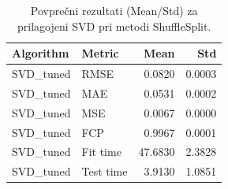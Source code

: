\begin{table}[h]
\centering
\caption{Povprečni rezultati (Mean/Std) za prilagojeni SVD pri metodi ShuffleSplit.}
\label{tab:cv_results_tuned_svd}
\begin{tabular}{llrr}
\toprule
Algorithm & Metric & Mean & Std \\
\midrule
SVD\_tuned & RMSE & 0.0820 & 0.0003 \\
SVD\_tuned & MAE & 0.0531 & 0.0002 \\
SVD\_tuned & MSE & 0.0067 & 0.0000 \\
SVD\_tuned & FCP & 0.9967 & 0.0001 \\
SVD\_tuned & Fit time & 47.6830 & 2.3828 \\
SVD\_tuned & Test time & 3.9130 & 1.0851 \\
\bottomrule
\end{tabular}

\end{table}
